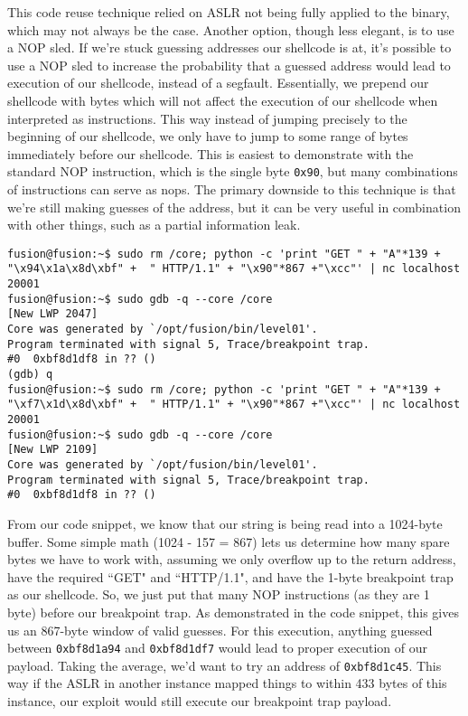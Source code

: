 This code reuse technique relied on ASLR not being fully applied
to the binary, which may not always be the case. Another option,
though less elegant, is to use a NOP sled. If we're stuck guessing
addresses our shellcode is at, it's possible to use a NOP sled
to increase the probability that a guessed address would lead
to execution of our shellcode, instead of a segfault. Essentially,
we prepend our shellcode with bytes which will not affect the execution 
of our shellcode when interpreted as instructions.
This way instead of jumping precisely to the beginning of our
shellcode, we only have to jump to some range of bytes immediately
before our shellcode. This is easiest to demonstrate with the standard
NOP instruction, which is the single byte \texttt{0x90}, but many combinations
of instructions can serve as nops. The primary downside to this technique
is that we're still making guesses of the address, but it can be very
useful in combination with other things, such as a partial information leak.

\begin{lstlisting}
fusion@fusion:~$ sudo rm /core; python -c 'print "GET " + "A"*139 + "\x94\x1a\x8d\xbf" +  " HTTP/1.1" + "\x90"*867 +"\xcc"' | nc localhost 20001
fusion@fusion:~$ sudo gdb -q --core /core                                                                                                      [New LWP 2047]
Core was generated by `/opt/fusion/bin/level01'.
Program terminated with signal 5, Trace/breakpoint trap.
#0  0xbf8d1df8 in ?? ()
(gdb) q
fusion@fusion:~$ sudo rm /core; python -c 'print "GET " + "A"*139 + "\xf7\x1d\x8d\xbf" +  " HTTP/1.1" + "\x90"*867 +"\xcc"' | nc localhost 20001
fusion@fusion:~$ sudo gdb -q --core /core                                                                                                      [New LWP 2109]
Core was generated by `/opt/fusion/bin/level01'.
Program terminated with signal 5, Trace/breakpoint trap.
#0  0xbf8d1df8 in ?? ()
\end{lstlisting}

From our code snippet, we know that our string is being read into
a 1024-byte buffer. Some simple math (1024 - 157 = 867) lets us determine
how many spare bytes we have to work with, assuming we only overflow
up to the return address, have the required ``GET" and ``HTTP/1.1",
and have the 1-byte breakpoint trap as our shellcode. So, we
just put that many NOP instructions (as they are 1 byte) before our
breakpoint trap. As demonstrated in the code snippet, this gives us
an 867-byte window of valid guesses.
For this execution, anything guessed between \texttt{0xbf8d1a94}
and \texttt{0xbf8d1df7} would lead to proper execution of our payload.
Taking the average, we'd want to try an address of \texttt{0xbf8d1c45}.
This way if the ASLR in another instance mapped things to within 433 bytes
of this instance, our exploit would still execute our breakpoint trap payload.

